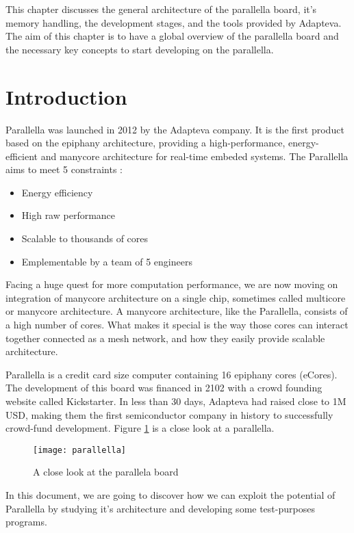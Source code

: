 This chapter discusses the general architecture of the parallella board, it's memory handling, the development stages, and the tools provided by Adapteva. The aim of this chapter is to have a global overview of the parallella board and the necessary key concepts to start developing on the parallella.

\section{Introduction}

Parallella was launched in 2012 by the Adapteva company. It is the first product based on the \gls{epiphany} architecture, providing a high-performance, energy-efficient and manycore architecture for real-time embeded systems. The Parallella aims to meet 5 constraints \cite{kickstarting} :

\begin{itemize}
  \item Energy efficiency
  \item High raw performance
  \item Scalable to thousands of cores
  \item Emplementable by a team of 5 engineers
\end{itemize}

Facing a huge quest for more computation performance, we are now moving on integration of manycore architecture on a single chip, sometimes called multicore or manycore architecture. A manycore architecture, like the Parallella, consists of a high number of cores. What makes it special is the way those cores can interact together connected as a mesh network, and how they easily provide scalable architecture.

Parallella is a credit card size computer containing 16 \gls{epiphany} cores (\glspl{eCore}). The development of this board was financed in 2102 with a crowd founding website called Kickstarter. In less than 30 days, Adapteva had raised close to 1M USD, making them the first semiconductor company in history to successfully crowd-fund development\cite{kickstarting}. Figure \ref{fig parallella} is a close look at a parallella.

\begin{figure}[h!]
\centering
\texttt{[image: parallella]}
\caption{A close look at the parallela board}
\label{fig parallella}
\end{figure}

In this document, we are going to discover how we can exploit the potential of Parallella by studying it's architecture and developing some test-purposes programs.


